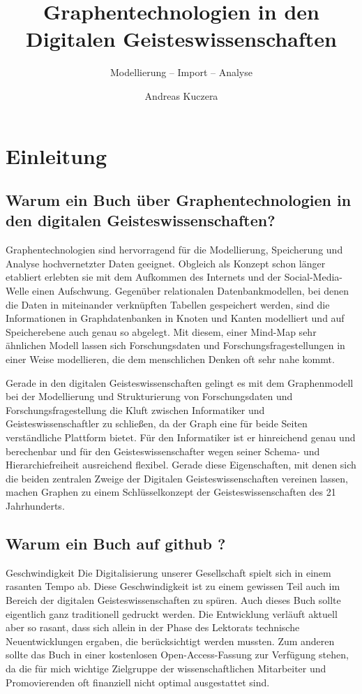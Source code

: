 \documentclass[12pt,ngerman,]{article}
\title{Graphentechnologien in den Digitalen Geisteswissenschaften}
\subtitle{Modellierung -- Import -- Analyse}
\author{Andreas Kuczera}
\date{}
\begin{document}
\maketitle

{
\setcounter{tocdepth}{3}
\tableofcontents
}
\section{Einleitung}\label{einleitung}

\subsection{Warum ein Buch über Graphentechnologien in den digitalen
Geisteswissenschaften?}\label{warum-ein-buch-uxfcber-graphentechnologien-in-den-digitalen-geisteswissenschaften}

Graphentechnologien sind hervorragend für die Modellierung, Speicherung
und Analyse hochvernetzter Daten geeignet. Obgleich als Konzept schon
länger etabliert erlebten sie mit dem Aufkommen des Internets und der
Social-Media-Welle einen Aufschwung. Gegenüber relationalen
Datenbankmodellen, bei denen die Daten in miteinander verknüpften
Tabellen gespeichert werden, sind die Informationen in Graphdatenbanken
in Knoten und Kanten modelliert und auf Speicherebene auch genau so
abgelegt. Mit diesem, einer Mind-Map sehr ähnlichen Modell lassen sich
Forschungsdaten und Forschungsfragestellungen in einer Weise
modellieren, die dem menschlichen Denken oft sehr nahe kommt.

Gerade in den digitalen Geisteswissenschaften gelingt es mit dem
Graphenmodell bei der Modellierung und Strukturierung von
Forschungsdaten und Forschungsfragestellung die Kluft zwischen
Informatiker und Geisteswissenschaftler zu schließen, da der Graph eine
für beide Seiten verständliche Plattform bietet. Für den Informatiker
ist er hinreichend genau und berechenbar und für den
Geisteswissenschafter wegen seiner Schema- und Hierarchiefreiheit
ausreichend flexibel. Gerade diese Eigenschaften, mit denen sich die
beiden zentralen Zweige der Digitalen Geisteswissenschaften vereinen
lassen, machen Graphen zu einem Schlüsselkonzept der
Geisteswissenschaften des 21 Jahrhunderts.

\subsection{Warum ein Buch auf github
?}\label{warum-ein-buch-auf-github}

Geschwindigkeit Die Digitalisierung unserer Gesellschaft spielt sich in
einem rasanten Tempo ab. Diese Geschwindigkeit ist zu einem gewissen
Teil auch im Bereich der digitalen Geisteswissenschaften zu spüren. Auch
dieses Buch sollte eigentlich ganz traditionell gedruckt werden. Die
Entwicklung verläuft aktuell aber so rasant, dass sich allein in der
Phase des Lektorats technische Neuentwicklungen ergaben, die
berücksichtigt werden mussten. Zum anderen sollte das Buch in einer
kostenlosen Open-Access-Fassung zur Verfügung stehen, da die für mich
wichtige Zielgruppe der wissenschaftlichen Mitarbeiter und
Promovierenden oft finanziell nicht optimal ausgestattet sind.
\end{document}
